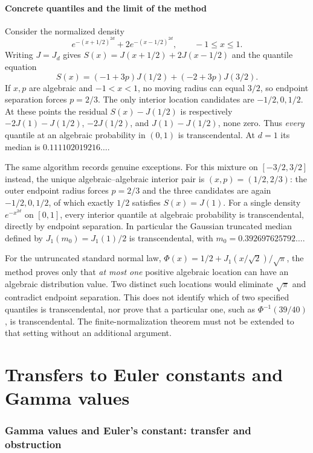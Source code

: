 \documentclass[11pt,a4paper]{article}
\theoremstyle{definition}
\theoremstyle{remark}
\numberwithin{equation}{section}
\begin{document}
\subsection{Concrete quantiles and the limit of the method}

Consider the normalized density
\[
e^{-(x+1/2)^{2d}}+2e^{-(x-1/2)^{2d}},\qquad -1\le x\le1.
\]
Writing $J=J_d$ gives $S(x)=J(x+1/2)+2J(x-1/2)$ and the quantile
equation
\[
S(x)=(-1+3p)J(1/2)+(-2+3p)J(3/2).
\]
If $x,p$ are algebraic and $-1<x<1$, no moving radius can equal
$3/2$, so endpoint separation forces $p=2/3$. The only interior
location candidates are $-1/2,0,1/2$. At these points the residual
$S(x)-J(1/2)$ is respectively
$-2J(1)-J(1/2)$, $-2J(1/2)$, and $J(1)-J(1/2)$, none zero.
Thus \emph{every} quantile at an algebraic probability in $(0,1)$
is transcendental. At $d=1$ its median is
$0.111102019216\ldots$.

The same algorithm records genuine exceptions. For this mixture
on $[-3/2,3/2]$ instead, the unique algebraic--algebraic interior
pair is $(x,p)=(1/2,2/3)$: the outer endpoint radius forces $p=2/3$
and the three candidates are again $-1/2,0,1/2$, of which exactly
$1/2$ satisfies $S(x)=J(1)$. For a single density $e^{-x^{2d}}$
on $[0,1]$, every interior quantile at algebraic probability is
transcendental, directly by endpoint separation. In particular the
Gaussian truncated median defined by
$J_1(m_0)=J_1(1)/2$ is transcendental, with
$m_0=0.392697625792\ldots$.

For the untruncated standard normal law,
$\Phi(x)=1/2+J_1(x/\sqrt2)/\sqrt\pi$, the method proves only that
\emph{at most one} positive algebraic location can have an algebraic
distribution value. Two distinct such locations would eliminate
$\sqrt\pi$ and contradict endpoint separation. This does not
identify which of two specified quantiles is transcendental, nor
prove that a particular one, such as $\Phi^{-1}(39/40)$, is
transcendental. The finite-normalization theorem must not be
extended to that setting without an additional argument.

\clearpage

\part{Transfers to Euler constants and Gamma values}
\section{Gamma values and Euler's constant: transfer and obstruction}
\label{gamma-section}
\end{document}
